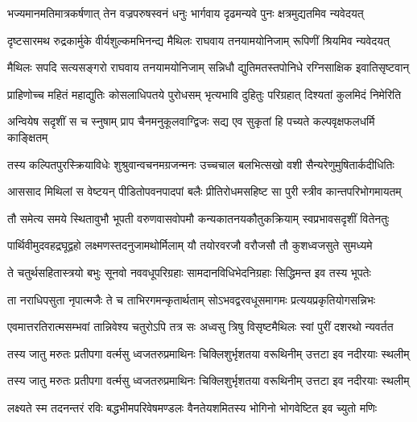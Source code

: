 \fourlineindentedshloka
{भज्यमानमतिमात्रकर्षणात्}
{तेन वज्रपरुषस्वनं धनुः}
{भार्गवाय दृढमन्यवे पुनः}
{क्षत्रमुद्यतमिव न्यवेदयत्} %

\fourlineindentedshloka
{दृष्टसारमथ रुद्रकार्मुके}
{वीर्यशुल्कमभिनन्द्य मैथिलः}
{राघवाय तनयामयोनिजाम्}
{रूपिणीं श्रियमिव न्यवेदयत्} %

\fourlineindentedshloka
{मैथिलः सपदि सत्यसङ्गरो}
{राघवाय तनयामयोनिजाम्}
{सन्निधौ द्युतिमतस्तपोनिधे}
{रग्निसाक्षिक इवातिसृष्टवान्} %

\fourlineindentedshloka
{प्राहिणोच्च महितं महाद्युतिः}
{कोसलाधिपतये पुरोधसम्}
{भृत्यभावि दुहितुः परिग्रहात्}
{दिश्यतां कुलमिदं निमेरिति} %

\fourlineindentedshloka
{अन्वियेष सदृशीं स च स्नुषाम्}
{प्राप चैनमनुकूलवाग्द्विजः}
{सद्य एव सुकृतां हि पच्यते}
{कल्पवृक्षफलधर्मि काङ्क्षितम्} %

\fourlineindentedshloka
{तस्य कल्पितपुरस्क्रियाविधेः}
{शुश्रुवान्वचनमग्रजन्मनः}
{उच्चचाल बलभित्सखो वशी}
{सैन्यरेणुमुषितार्कदीधितिः} %

\fourlineindentedshloka
{आससाद मिथिलां स वेष्टयन्}
{पीडितोपवनपादपां बलैः}
{प्रीतिरोधमसहिष्ट सा पुरी}
{स्त्रीव कान्तपरिभोगमायतम्} %

\fourlineindentedshloka
{तौ समेत्य समये स्थितावुभौ}
{भूपती वरुणवासवोपमौ}
{कन्यकातनयकौतुकक्रियाम्}
{स्वप्रभावसदृशीं वितेनतुः} %

\fourlineindentedshloka
{पार्थिवीमुदवहद्रघूद्वहो}
{लक्ष्मणस्तदनुजामथोर्मिलाम्}
{यौ तयोरवरजौ वरौजसौ}
{तौ कुशध्वजसुते सुमध्यमे} %

\fourlineindentedshloka
{ते चतुर्थसहितास्त्रयो बभुः}
{सूनवो नववधूपरिग्रहाः}
{सामदानविधिभेदनिग्रहाः}
{सिद्धिमन्त इव तस्य भूपतेः} %

\fourlineindentedshloka
{ता नराधिपसुता नृपात्मजैः}
{ते च ताभिरगमन्कृतार्थताम्}
{सोऽभवद्वरवधूसमागमः}
{प्रत्ययप्रकृतियोगसन्निभः} %

\fourlineindentedshloka
{एवमात्तरतिरात्मसम्भवां}
{तान्निवेश्य चतुरोऽपि तत्र सः}
{अध्वसु त्रिषु विसृष्टमैथिलः}
{स्वां पुरीं दशरथो न्यवर्तत} %

\fourlineindentedshloka
{तस्य जातु मरुतः प्रतीपगा}
{वर्त्मसु ध्वजतरुप्रमाथिनः}
{चिक्लिशुर्भृशतया वरूथिनीम्}
{उत्तटा इव नदीरयाः स्थलीम्} %

\fourlineindentedshloka
{तस्य जातु मरुतः प्रतीपगा}
{वर्त्मसु ध्वजतरुप्रमाथिनः}
{चिक्लिशुर्भृशतया वरूथिनीम्}
{उत्तटा इव नदीरयाः स्थलीम्} %

\fourlineindentedshloka
{लक्ष्यते स्म तदनन्तरं रविः}
{बद्धभीमपरिवेषमण्डलः}
{वैनतेयशमितस्य भोगिनो}
{भोगवेष्टित इव च्युतो मणिः} %


